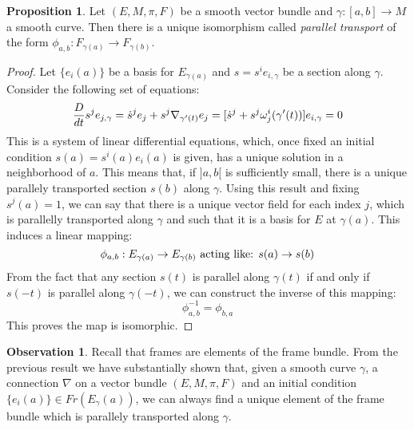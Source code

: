 \documentclass[12pt,a4paper]{report}
\theoremstyle{definition}
\theoremstyle{Theorem}
\newtheorem{Prop}[Def]{Proposition}
\theoremstyle{definition}
\theoremstyle{definition}
\newtheorem{Obs}[Def]{Observation}
\begin{document}
	\begin{Prop}
		Let $(E,M,\pi,F)$ be a smooth vector bundle and $\gamma:[a,b]\rightarrow M$ a smooth curve. Then there is a unique isomorphism called \textit{parallel transport} of the form $\phi_{a,b}:F_{\gamma(a)}\rightarrow F_{\gamma(b)}$.
	\end{Prop}
	\begin{proof}
		Let $\{e_i(a)\}$ be a basis for $E_{\gamma(a)}$ and $s=s^ie_{i,\gamma}$ be a section along $\gamma$. Consider the following set of equations:
		$${D\over dt}{s^je_{j,\gamma}}=\dot{s}^je_j+s^j\nabla_{\gamma'(t)}e_j=[\dot{s}^j+s^j\omega^i_j(\gamma'(t))]e_{i,\gamma}=0$$
		This is a system of linear differential equations, which, once fixed an initial condition $s(a)=s^i(a)e_i(a)$ is given, has a unique solution in a neighborhood of $a$.  This means that, if $]a,b[$ is sufficiently small, there is a unique parallely transported section $s(b)$ along $\gamma$. Using this result and fixing $s^j(a)=1$, we can say that there is a unique vector field for each index $j$, which is parallelly transported along $\gamma$ and such that it is a basis for $E$ at $\gamma(a)$. This induces a linear mapping:
		$$\phi_{a,b}:E_{\gamma(a)}\rightarrow E_{\gamma(b)}\hbox{ acting like: } s(a)\rightarrow s(b)$$
		From the fact that any section $s(t)$ is parallel along $\gamma(t)$ if and only if $s(-t)$ is parallel along $\gamma(-t)$, we can construct the inverse of this mapping:
		$$\phi^{-1}_{a,b}=\phi_{b,a}$$
		This proves the map is isomorphic.
	\end{proof}
	\begin{Obs}
		Recall that frames are elements of the frame bundle. From the previous result we have substantially shown that, given a smooth curve $\gamma$, a connection $\nabla$ on a vector bundle $(E,M,\pi,F)$ and an initial condition $\{e_i(a)\}\in Fr(E_\gamma(a))$, we can always find a unique element of the frame bundle which is parallely transported along $\gamma$.
	\end{Obs}
	\begin{comment}
		We now look at the notion of parallel transport on the tangent bundle of a manifold.
		\section{The parallel transport on the tangent bundle}
		In this section we will use the previous results to study the notion of parallel transport on the tangent bundle of a smooth manifold. More information on this topic can be found in [2] chap.3 pag. 95-102.
	\end{comment}
\end{document}
